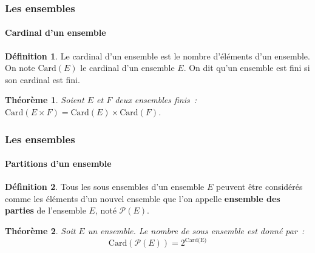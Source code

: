 \documentclass[10pt,notheorems]{beamer}
\theoremstyle{plain}
\newtheorem{theorem}{Théorème}
\theoremstyle{definition} %
\newtheorem{definition}{Définition}
\begin{document}
\begin{frame}
  \frametitle{Les ensembles}
  \framesubtitle{Cardinal d'un ensemble}
  \hypertarget{slide_ensembles_cardinal}{}


  \begin{definition}\label{def:cardinal} Le cardinal d'un ensemble est le nombre d'éléments d'un ensemble. On note $\textrm{Card}(E)$ le cardinal d'un ensemble $E$. On dit qu'un ensemble est fini si son cardinal est fini.
  \end{definition}

  \bigskip

  \begin{theorem}\label{thm:cardinal} Soient $E$ et $F$ deux ensembles finis~: $\textrm{Card}(E\times F) = \textrm{Card}(E)\times \textrm{Card}(F)$.
  \end{theorem}

\end{frame}


\begin{frame}
  \frametitle{Les ensembles}
  \framesubtitle{Partitions d'un ensemble}
  \hypertarget{slide_ensembles_partitions}{}


  \begin{definition}\label{def:partitions} Tous les sous ensembles d'un ensemble $E$ peuvent être considérés comme les éléments d'un nouvel ensemble que l'on appelle \textbf{ensemble des parties} de l'ensemble $E$, noté $\mathcal P(E)$.
  \end{definition}

  \bigskip

  \begin{theorem}\label{thm:partitions} Soit $E$ un ensemble. Le nombre de sous ensemble est donné par~:
    \[
      \textrm{Card}(\mathcal P(E)) = 2^{\textrm{Card(E)}}
    \]
  \end{theorem}

\end{frame}
\end{document}
